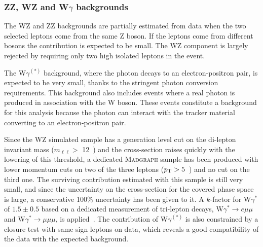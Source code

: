 	\subsubsection{ZZ, WZ and W\texorpdfstring{$\gamma$}{gamma} backgrounds\label{sec:otherbkg}}

The WZ and ZZ backgrounds are partially estimated from data when the two
selected leptons come from the same Z boson. If the leptons come from different
bosons the contribution is expected to be small. The WZ component is largely
rejected by requiring only two high \pt isolated leptons in the event. 

The W$\gamma^{(*)}$ background, where the photon decays to an electron-positron pair,
is expected to be very small, thanks to the stringent photon conversion
requirements. This background also includes events where a real photon is produced in association with the W boson. These events constitute a background for this analysis because the photon can interact with the tracker material converting to an electron-positron pair.

Since the WZ simulated sample has a generation level cut on the
di-lepton invariant mass ($m_{\ell\ell} >$ 12~\GeV) and the cross-section raises
quickly with the lowering of this threshold, a dedicated \textsc{Madgraph} sample has
been produced with lower momentum cuts on two of the three leptons
($p_\mathrm{T} > 5$~\GeV) and no cut on the third one. The surviving contribution
estimated with this sample is still very small, and since the uncertainty on the
cross-section for the covered phase space is large, a conservative 100\%
uncertainty has been given to it. 
A $k$-factor for W$\gamma^{*}$ of $1.5\pm0.5$ based on a dedicated measurement of 
tri-lepton decays, W$\gamma^{*} \to e\mu\mu$ and W$\gamma^{*} \to \mu\mu\mu$,
is applied~\cite{Chatrchyan:2013iaa}. 
The contribution of W$\gamma^{(*)}$ is also
constrained by a closure test with same sign leptons on data, which reveals a
good compatibility of the data with the expected background.


